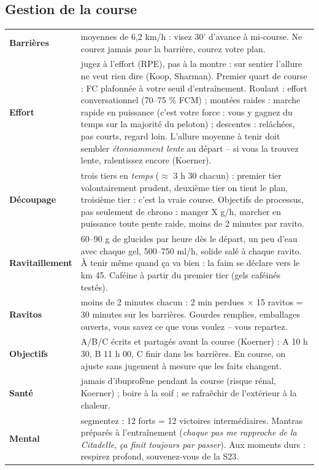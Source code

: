 \documentclass[10pt,a4paper]{article}
\newcommand{\key}[1]{\textbf{\sffamily\small\color{acc}#1}}
\begin{document}
\subsection{Gestion de la course}
\begin{center}
\begin{tabularx}{\textwidth}{@{}lX@{}}
\toprule
\key{Barri\`eres} & moyennes de 6,2 km/h : visez 30' d'avance \`a mi-course. Ne courez jamais \emph{pour} la barri\`ere, courez votre plan.\\
\key{Effort} & jugez \`a l'effort (RPE), pas \`a la montre : sur sentier l'allure ne veut rien dire (Koop, Sharman). Premier quart de course : FC plafonn\'ee \`a votre seuil d'entra\^inement. Roulant : effort conversationnel (70--75 \% FCM) ; mont\'ees raides : marche rapide en puissance (c'est votre force : vous y gagnez du temps sur la majorit\'e du peloton) ; descentes : rel\^ach\'ees, pas courts, regard loin. L'allure moyenne \`a tenir doit sembler \emph{\'etonnamment lente} au d\'epart -- si vous la trouvez lente, ralentissez encore (Koerner).\\
\key{D\'ecoupage} & trois tiers en \emph{temps} ($\approx$ 3 h 30 chacun) : premier tier volontairement prudent, deuxi\`eme tier on tient le plan, troisi\`eme tier : c'est la vraie course. Objectifs de processus, pas seulement de chrono : manger X g/h, marcher en puissance toute pente raide, moins de 2 minutes par ravito.\\
\key{Ravitaillement} & 60--90 g de glucides par heure d\`es le d\'epart, un peu d'eau avec chaque gel, 500--750 ml/h, solide sal\'e \`a chaque ravito. \`A tenir m\^eme quand \c{c}a va bien : la faim se d\'eclare vers le km 45. Caf\'eine \`a partir du premier tier (gels caf\'ein\'es test\'es).\\
\key{Ravitos} & moins de 2 minutes chacun : 2 min perdues $\times$ 15 ravitos = 30 minutes sur les barri\`eres. Gourdes remplies, emballages ouverts, vous savez ce que vous voulez -- vous repartez.\\
\key{Objectifs} & A/B/C \'ecrits et partag\'es avant la course (Koerner) : A 10 h 30, B 11 h 00, C finir dans les barri\`eres. En course, on ajuste sans jugement \`a mesure que les faits changent.\\
\key{Sant\'e} & jamais d'ibuprof\`ene pendant la course (risque r\'enal, Koerner) ; boire \`a la soif ; se rafra\^echir de l'ext\'erieur \`a la chaleur.\\
\key{Mental} & segmentez : 12 forts = 12 victoires interm\'ediaires. Mantras pr\'epar\'es \`a l'entra\^inement (\emph{chaque pas me rapproche de la Citadelle}, \emph{\c{c}a finit toujours par passer}). Aux moments durs : respirez profond, souvenez-vous de la S23.\\

\end{tabularx}
\end{center}
\end{document}
